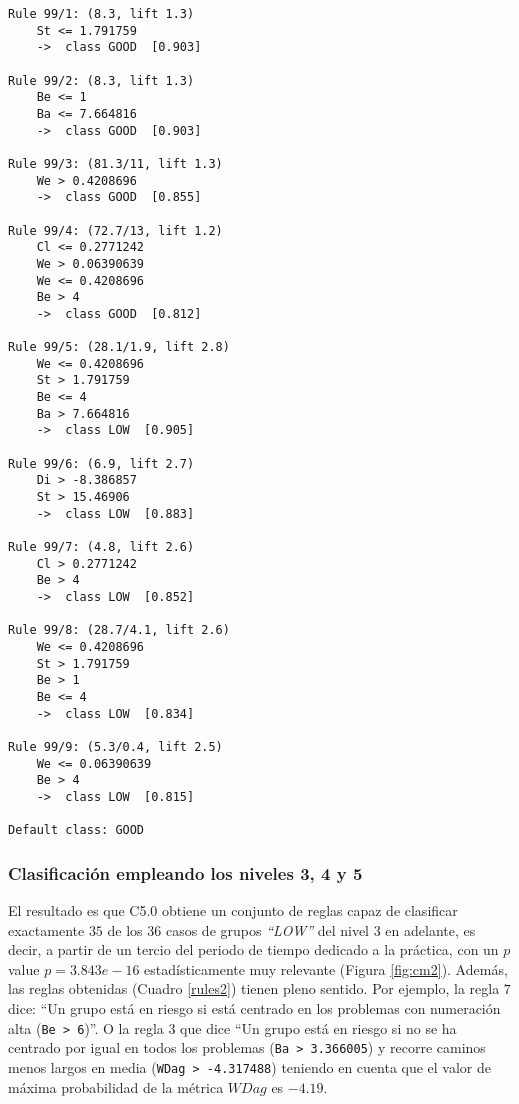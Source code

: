 \begin{tcolorbox}[title=Reglas de clasificación para identificar grupos de tipo \emph{``LOW''}.]
  \makeatletter
  \makeatother
\begin{multicols}{2}
    \begin{verbatim}
Rule 99/1: (8.3, lift 1.3)
	St <= 1.791759
	->  class GOOD  [0.903]

Rule 99/2: (8.3, lift 1.3)
	Be <= 1
	Ba <= 7.664816
	->  class GOOD  [0.903]

Rule 99/3: (81.3/11, lift 1.3)
	We > 0.4208696
	->  class GOOD  [0.855]

Rule 99/4: (72.7/13, lift 1.2)
	Cl <= 0.2771242
	We > 0.06390639
	We <= 0.4208696
	Be > 4
	->  class GOOD  [0.812]

Rule 99/5: (28.1/1.9, lift 2.8)
	We <= 0.4208696
	St > 1.791759
	Be <= 4
	Ba > 7.664816
	->  class LOW  [0.905]

Rule 99/6: (6.9, lift 2.7)
	Di > -8.386857
	St > 15.46906
	->  class LOW  [0.883]

Rule 99/7: (4.8, lift 2.6)
	Cl > 0.2771242
	Be > 4
	->  class LOW  [0.852]

Rule 99/8: (28.7/4.1, lift 2.6)
	We <= 0.4208696
	St > 1.791759
	Be > 1
	Be <= 4
	->  class LOW  [0.834]

Rule 99/9: (5.3/0.4, lift 2.5)
	We <= 0.06390639
	Be > 4
	->  class LOW  [0.815]

Default class: GOOD
    \end{verbatim}
  \end{multicols}
\label{rules3}
\end{tcolorbox}

\subsubsection{Clasificación empleando los niveles 3, 4 y 5}

El resultado es que C5.0 obtiene un conjunto de reglas capaz de clasificar exactamente $35$ de los $36$ casos de grupos \emph{``LOW''} del nivel $3$ en adelante, es decir, a partir de un tercio del periodo de tiempo dedicado a la práctica, con un $p$ value $p = 3.843e-16$ estadísticamente muy relevante (Figura \ref{fig:cm2}). Además, las reglas obtenidas (Cuadro \ref{rules2}) tienen pleno sentido. Por ejemplo, la regla $7$ dice: ``Un grupo está en riesgo si está centrado en los problemas con numeración alta (\texttt{Be > 6})''. O la regla $3$ que dice ``Un grupo está en riesgo si no se ha centrado por igual en todos los problemas (\texttt{Ba > 3.366005}) y recorre caminos menos largos en media (\texttt{WDag > -4.317488}) teniendo en cuenta que el valor de máxima probabilidad de la métrica $WDag$ es $-4.19$.

